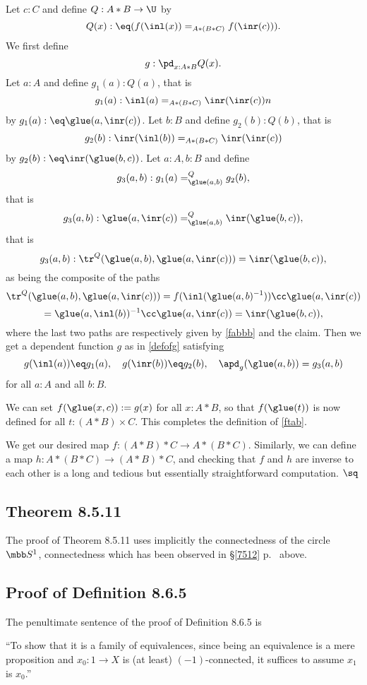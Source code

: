 \documentclass[12pt]{article}
\begin{document}
Let $c:C$ and define $Q:A*B\to\U$ by 
$$
Q(x):\eq(f(\inl(x))=_{A*(B*C)}f(\inr(c))).
$$ 
We first define 
\begin{equation}\label{defofg}
g:\pd_{x:A*B}Q(x).
\end{equation}
Let $a:A$ and define $g_1(a):Q(a)$, that is
$$
g_1(a):\inl(a)=_{A*(B*C)}\inr(\inr(c))n
$$ 
by $g_1(a):\eq\glue(a,\inr(c))$. Let $b:B$ and define $g_2(b):Q(b)$, that is
$$
g_2(b):\inr(\inl(b))=_{A*(B*C)}\inr(\inr(c))
$$ 
by $g_2(b):\eq\inr(\glue(b,c))$. Let $a:A,b:B$ and define 
$$
g_3(a,b):g_1(a)=^Q_{\glue(a,b)}g_2(b),
$$ 
that is 
$$
g_3(a,b):\glue(a,\inr(c))=^Q_{\glue(a,b)}\inr(\glue(b,c)),
$$ 
that is 
$$
g_3(a,b):\tr^Q(\glue(a,b),\glue(a,\inr(c)))=\inr(\glue(b,c)),
$$ 
as being the composite of the paths 
$$
\tr^Q(\glue(a,b),\glue(a,\inr(c)))=f(\inl(\glue(a,b)^{-1}))\cc\glue(a,\inr(c))
$$ 
$$
=\glue(a,\inl(b))^{-1}\cc\glue(a,\inr(c))=\inr(\glue(b,c)),
$$ 
where the last two paths are respectively given by \eqref{fabbb} and the claim. Then we get a dependent function $g$ as in \eqref{defofg} satisfying 
$$
g(\inl(a))\eq g_1(a),\quad g(\inr(b))\eq g_2(b),\quad \apd_g(\glue(a,b))=g_3(a,b)
$$ 
for all $a:A$ and all $b:B$. 

We can set $f(\glue(x,c)):=g(x)$ for all $x:A*B$, so that $f(\glue(t))$ is now defined for all $t:(A*B)\times C$. This completes the definition of \eqref{ftab}.

We get our desired map $f:(A*B)*C\to A*(B*C)$. Similarly, we can define a map $h:A*(B*C)\to(A*B)*C$, and checking that $f$ and $h$ are inverse to each other is a long and tedious but essentially straightforward computation. $\sq$


\subsection{Theorem 8.5.11}%

The proof of Theorem 8.5.11 uses implicitly the connectedness of the circle $\mbb S^1$, connectedness which has been observed in \S\ref{7512} p.~\pageref{7512} above.


\subsection{Proof of Definition 8.6.5}%

The penultimate sentence of the proof of Definition 8.6.5 is

\nn``To show that it is a family of equivalences, since being an equivalence is a mere proposition and $x_0:1\to X$ is (at least) $(-1)$-connected, it suffices to assume $x_1$ is $x_0$.''
\end{document}
